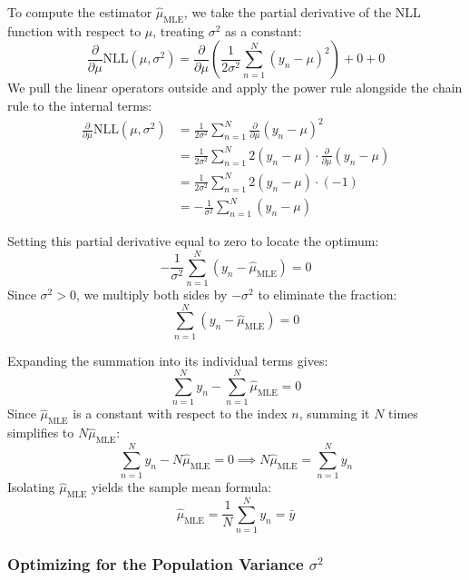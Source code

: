 \documentclass{article}
\begin{document}
To compute the estimator $\hat{\mu}_{\text{MLE}}$, we take the partial derivative of the $\text{NLL}$ function with respect to $\mu$, treating $\sigma^2$ as a constant:
\begin{equation}
\frac{\partial}{\partial \mu}\text{NLL}(\mu, \sigma^2) = \frac{\partial}{\partial \mu}\left( \frac{1}{2\sigma^2}\sum_{n=1}^N (y_n - \mu)^2 \right) + 0 + 0
\end{equation}
We pull the linear operators outside and apply the power rule alongside the chain rule to the internal terms:
\begin{align*}
\frac{\partial}{\partial \mu}\text{NLL}(\mu, \sigma^2) &= \frac{1}{2\sigma^2} \sum_{n=1}^N \frac{\partial}{\partial \mu}(y_n - \mu)^2 \\
&= \frac{1}{2\sigma^2} \sum_{n=1}^N 2(y_n - \mu) \cdot \frac{\partial}{\partial \mu}(y_n - \mu) \\
&= \frac{1}{2\sigma^2} \sum_{n=1}^N 2(y_n - \mu) \cdot (-1) \\
&= -\frac{1}{\sigma^2} \sum_{n=1}^N (y_n - \mu)
\end{align*}

Setting this partial derivative equal to zero to locate the optimum:
\begin{equation}
-\frac{1}{\sigma^2} \sum_{n=1}^N (y_n - \hat{\mu}_{\text{MLE}}) = 0
\end{equation}
Since $\sigma^2 > 0$, we multiply both sides by $-\sigma^2$ to eliminate the fraction:
\begin{equation}
\sum_{n=1}^N (y_n - \hat{\mu}_{\text{MLE}}) = 0
\end{equation}

Expanding the summation into its individual terms gives:
\begin{equation}
\sum_{n=1}^N y_n - \sum_{n=1}^N \hat{\mu}_{\text{MLE}} = 0
\end{equation}
Since $\hat{\mu}_{\text{MLE}}$ is a constant with respect to the index $n$, summing it $N$ times simplifies to $N\hat{\mu}_{\text{MLE}}$:
\begin{equation}
\sum_{n=1}^N y_n - N\hat{\mu}_{\text{MLE}} = 0 \implies N\hat{\mu}_{\text{MLE}} = \sum_{n=1}^N y_n
\end{equation}
Isolating $\hat{\mu}_{\text{MLE}}$ yields the sample mean formula:
\begin{equation}
\hat{\mu}_{\text{MLE}} = \frac{1}{N}\sum_{n=1}^N y_n = \bar{y}
\end{equation}

\subsubsection{Optimizing for the Population Variance $\sigma^2$}
\end{document}
